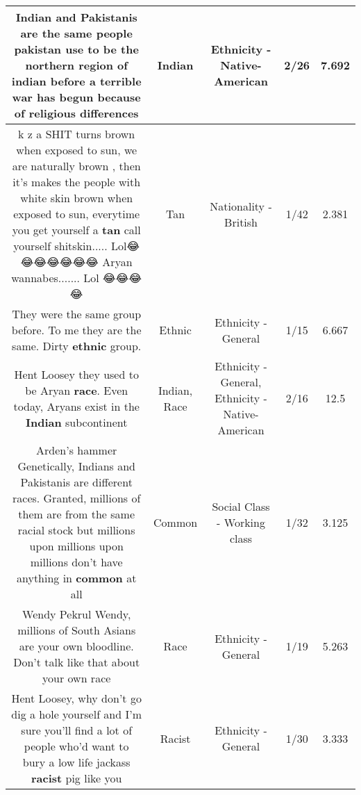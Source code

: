 \documentclass[11pt]{article}
\newlength\mylength
\begin{document}
\begin{center}
\begin{longtable}{|C{.65\mylength}|C{.30\mylength}|C{.12\mylength}|C{.12\mylength}|C{.12\mylength}|}
  \small Indian and Pakistanis are the same people pakistan use to be the northern region of \textbf{indian} before a terrible war has begun because of religious differences\normalsize   & Indian & Ethnicity - Native-American & 2/26 & 7.692 \\  \hline
  \small k z a SHIT turns brown when exposed to sun, we are naturally brown , then it's makes the people with white skin brown when exposed to sun, everytime you get yourself a \textbf{tan} call yourself shitskin..... Lol😂😂😂😂😂😂😂 Aryan wannabes....... Lol 😂😂😂😂\normalsize   & Tan & Nationality - British & 1/42 & 2.381 \\  \hline
  \small They were the same group before. To me they are the same. Dirty \textbf{ethnic} group.\normalsize   & Ethnic & Ethnicity - General & 1/15 & 6.667 \\  \hline
  \small Hent Loosey they used to be Aryan \textbf{race}. Even today, Aryans exist in the \textbf{Indian} subcontinent\normalsize   & Indian, Race & Ethnicity - General, Ethnicity - Native-American & 2/16 & 12.5 \\  \hline
  \small Arden's hammer Genetically, Indians and Pakistanis are different races. Granted, millions of them are from the same racial stock but millions upon millions upon millions don't have anything in \textbf{common} at all\normalsize   & Common & Social Class - Working class & 1/32 & 3.125 \\  \hline
  \small Wendy Pekrul Wendy, millions of South Asians are your own bloodline. Don't talk like that about your own race\normalsize   & Race & Ethnicity - General & 1/19 & 5.263 \\  \hline
  \small Hent Loosey, why don't go dig a hole yourself and I'm sure you'll find a lot of people who'd want to bury a low life jackass \textbf{racist} pig like you\normalsize   & Racist & Ethnicity - General & 1/30 & 3.333 \\  \hline

\end{longtable}
\end{center}
\end{document}
